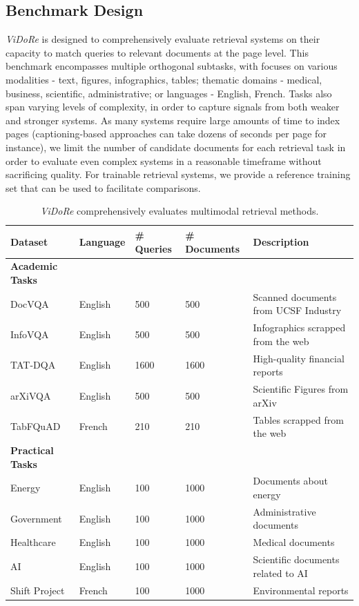 \documentclass{article} %
\begin{document}
\subsection{Benchmark Design}
\textit{ViDoRe} is designed to comprehensively evaluate retrieval systems on their capacity to match queries to relevant documents at the page level. This benchmark encompasses multiple orthogonal subtasks, with focuses on various modalities - text, figures, infographics, tables; thematic domains - medical, business, scientific, administrative; or languages - English, French. Tasks also span varying levels of complexity, in order to capture signals from both weaker and stronger systems.  
As many systems require large amounts of time to index pages (captioning-based approaches can take dozens of seconds per page for instance), we limit the number of candidate documents for each retrieval task in order to evaluate even complex systems in a reasonable timeframe without sacrificing quality. For trainable retrieval systems, we provide a reference training set that can be used to facilitate comparisons.


\begin{table}[ht]
    \centering
    \label{tab:docvisbench}
    \small
    \begin{tabular}{lllll}
        \toprule
        \textbf{Dataset} & \textbf{Language} & \textbf{\# Queries} & \textbf{\# Documents} &\textbf{Description}\\
        \midrule
        \textbf{Academic Tasks} & &\\
        DocVQA   &English  &  500 &500 & Scanned documents from UCSF Industry   \\
        InfoVQA  &English & 500 &500 & Infographics scrapped from the web\\
        TAT-DQA  &English  & 1600& 1600 & High-quality financial reports\\
        arXiVQA  &English & 500 &500& Scientific Figures from arXiv\\
        TabFQuAD &French & 210& 210  & Tables scrapped from the web \\
        \midrule
        \textbf{Practical Tasks} & \\
        Energy &English & 100 &1000 & Documents about energy\\
        Government &English & 100 &1000 & Administrative documents\\
        Healthcare &English &  100 &1000& Medical documents\\
        AI &English & 100 &1000 & Scientific documents related to AI\\
        Shift Project &French & 100 &1000 & Environmental reports\\
        \bottomrule
    \end{tabular}
    \caption{\textit{ViDoRe} comprehensively evaluates multimodal retrieval methods.}
    \label{table:docvisbench_eval_overview}
\end{table}
\end{document}
